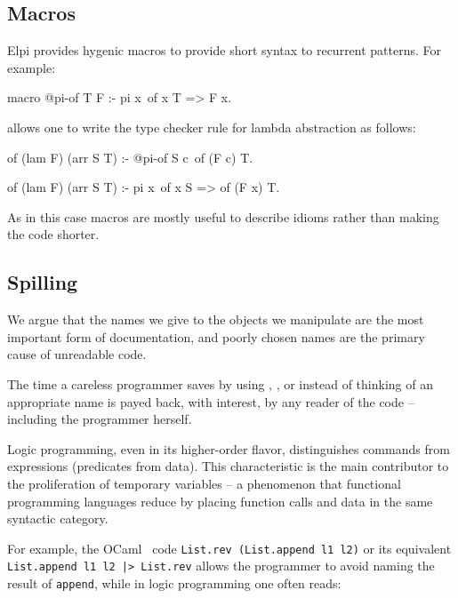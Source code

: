 \documentclass{these-ISSS}
\newenvironment{elpicode}
  {\VerbatimEnvironment\begin{elpibox}\begin{xelpicode}}{\end{xelpicode}
\end{elpibox}}
\begin{document}
\subsection{Macros}\label{sec:macros}

Elpi provides hygenic macros to provide short syntax to recurrent patterns.
For example:

\begin{elpicode}
macro @pi-of T F      :- pi x\ of x T => F x.
\end{elpicode}

\noindent allows one to write the type checker rule for lambda abstraction
as follows:

\begin{elpicode}
of (lam F) (arr S T) :- @pi-of S c\ of (F c) T.

of (lam F) (arr S T) :- pi x\ of x S => of (F x) T.
\end{elpicode}

\noindent
As in this case macros are mostly useful to describe idioms rather than
making the code shorter.


\subsection{Spilling}\label{sec:spilling}


We argue that the names we give to the objects we manipulate are the most
important form of documentation, and poorly chosen names are the primary cause
of unreadable code.

The time a careless programmer saves by using , , or
 instead of thinking of an appropriate name is payed back, with
interest, by any reader of the code -- including the programmer herself.

Logic programming, even in its higher-order flavor, distinguishes commands
from expressions (predicates from data). This characteristic is the main
contributor to the proliferation of temporary variables -- a phenomenon that
functional programming languages reduce by placing function calls and data in
the same syntactic category.

For example, the OCaml~\cite{leroy3ocaml} code \texttt{List.rev (List.append l1 l2)} or its
equivalent \texttt{List.append l1 l2 |> List.rev} allows the programmer to
avoid naming the result of \texttt{append}, while in logic programming one
often reads:
\end{document}
